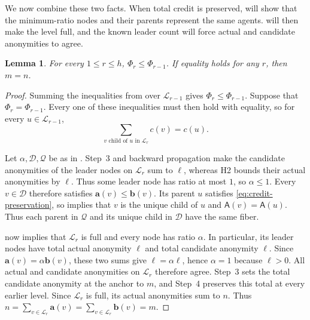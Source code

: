 \documentclass[11pt]{article}
\newcommand{\anon}{\mathbf a}
\newcommand{\cand}{\mathbf b}
\newcommand{\agents}{\mathsf A}
\newtheorem{lemma}{Lemma}
\begin{document}
We now combine these two facts.  When total credit is preserved,
 will show that the minimum-ratio
nodes and their parents represent the same agents.
 will then make the level
full, and the known leader count will force actual and
candidate anonymities to agree.

\begin{lemma}
\label{lem:credit-loss-split}
For every \(1\leq r\leq h\),
\(\Phi_r\leq\Phi_{r-1}\).
If equality holds for any \(r\), then \(m=n\).
\end{lemma}

\begin{proof}
Summing the inequalities from 
over \(\mathcal L_{r-1}\) gives \(\Phi_r\leq\Phi_{r-1}\).
Suppose that \(\Phi_r=\Phi_{r-1}\).
Every one of these inequalities must then hold with equality,
so for every \(u\in\mathcal L_{r-1}\),
\begin{equation}
\label{eq:credit-preservation}
 \sum_{v\text{ child of }u\text{ in }\mathcal L_r}c(v)=c(u).
\end{equation}

Let \(\alpha,\mathcal D,\mathcal Q\) be as in
.
Step~3 and backward propagation make the candidate anonymities of
the leader nodes on \(\mathcal L_r\) sum to \(\ell\), whereas H2
bounds their actual anonymities by \(\ell\).
Thus some leader node has ratio at most \(1\), so \(\alpha\leq1\).
Every \(v\in\mathcal D\) therefore satisfies \(\anon(v)\leq\cand(v)\).
Its parent \(u\) satisfies \eqref{eq:credit-preservation}, so
 implies that \(v\) is the unique child of \(u\) and \(\agents(v)=\agents(u)\).
Thus each parent in \(\mathcal Q\) and its unique child in
\(\mathcal D\) have the same fiber.

 now implies that
\(\mathcal L_r\) is full and every node has ratio \(\alpha\).
In particular, its leader nodes have total actual anonymity
\(\ell\) and total candidate anonymity \(\ell\).
Since \(\anon(v)=\alpha\cand(v)\), these two sums give
\(\ell=\alpha\ell\), hence \(\alpha=1\) because \(\ell>0\).
All actual and candidate anonymities on \(\mathcal L_r\) therefore agree.
Step~3 sets the total candidate anonymity at the anchor to \(m\),
and Step~4 preserves this total at every earlier level.
Since \(\mathcal L_r\) is full, its actual anonymities sum
to \(n\). Thus
\(n=\sum_{v\in\mathcal L_r}\anon(v)
=\sum_{v\in\mathcal L_r}\cand(v)=m\).
\end{proof}
\end{document}
